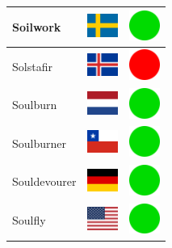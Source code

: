 \documentclass[12pt, a4paper, twoside]{report}
\begin{document}
\begin{center}
\begin{longtable}{|p{5cm}|p{2cm}|p{2cm}|}
 Soilwork                                                   & \includegraphics[width=1cm]{4x3/se} &   \includegraphics[width=1cm]{likes/y} \\ \hline
 Solstafir                                                  & \includegraphics[width=1cm]{4x3/is} &   \includegraphics[width=1cm]{likes/n} \\ \hline
 Soulburn                                                   & \includegraphics[width=1cm]{4x3/nl} &   \includegraphics[width=1cm]{likes/y} \\ \hline
 Soulburner                                                 & \includegraphics[width=1cm]{4x3/cl} &   \includegraphics[width=1cm]{likes/y} \\ \hline
 Souldevourer                                               & \includegraphics[width=1cm]{4x3/de} &   \includegraphics[width=1cm]{likes/y} \\ \hline
 Soulfly                                                    & \includegraphics[width=1cm]{4x3/us} &   \includegraphics[width=1cm]{likes/y} \\ \hline

\end{longtable}
\end{center}
\end{document}
